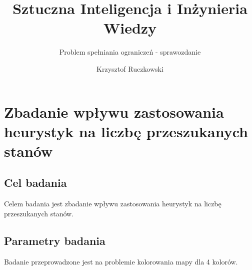 \documentclass[12pt,a4paper]{article}
\author{Krzysztof Ruczkowski}
\title{Sztuczna Inteligencja i Inżynieria Wiedzy}
\subtitle{Problem spełniania ograniczeń - sprawozdanie}
\begin{document}
\maketitle
\tableofcontents
\newpage

\section{Zbadanie wpływu zastosowania heurystyk na liczbę przeszukanych stanów}

\subsection{Cel badania}
Celem badania jest zbadanie wpływu zastosowania heurystyk na liczbę przeszukanych stanów.
\subsection{Parametry badania}
Badanie przeprowadzone jest na problemie kolorowania mapy dla 4 kolorów.
\end{document}
